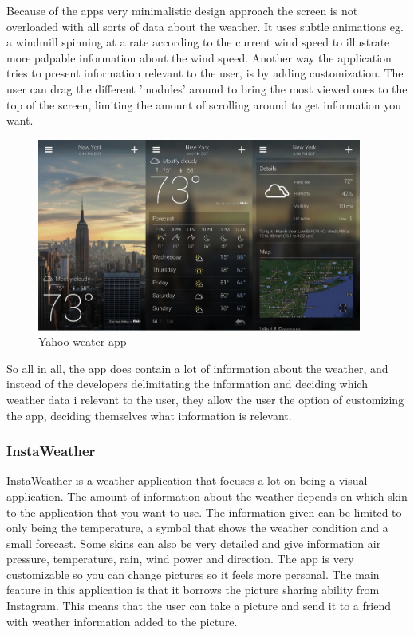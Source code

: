 Because of the apps very minimalistic design approach the screen is not overloaded with all sorts of data about the weather.
It uses subtle animations  eg. a windmill spinning at a rate according to the current wind speed to illustrate more palpable information about the wind speed. 
Another way the application tries to present information relevant to the user, is by adding customization. 
The user can drag the different 'modules' around to bring the most viewed ones to the top of the screen, limiting the amount of scrolling around to get information you want.

\begin{figure}[!htbp]
    \centering
    \includegraphics[width=0.95\textwidth]{images/Yahoo1.png}
    \caption{Yahoo weater app}
    \label{fig:yahoo1}
\end{figure}

So all in all, the app does contain a lot of information about the weather, and instead of the developers delimitating the information and deciding which weather data i relevant to the user, they allow the user the option of customizing the app, deciding themselves what information is relevant. 



\subsubsection{InstaWeather} %
\label{ssub:instaweather}

InstaWeather is a weather application that focuses a lot on being a visual application. 
The amount of information about the weather depends on which skin to the application that you want to use. 
The information given can be limited to only being the temperature, a symbol that shows the weather condition and a small forecast. 
Some skins can also be very detailed and give information air pressure, temperature, rain, wind power and direction. 
The app is very customizable so you can change pictures so it feels more personal. 
The main feature in this application is that it borrows the picture sharing ability from Instagram. 
This means that the user can take a picture and send it to a friend with weather information added to the picture.  

